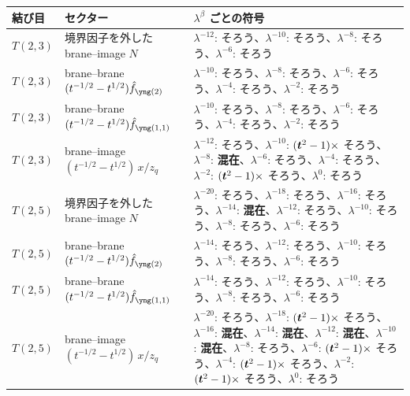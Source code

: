 \begin{center}
\footnotesize
\begin{tabular}{llp{9.2cm}}
\toprule
結び目 & セクター & $\lambda^\beta$ ごとの符号 \\
\midrule
$T(2,3)$ & 境界因子を外した brane--image $N$ & $\lambda^{-12}$: そろう、\allowbreak $\lambda^{-10}$: そろう、\allowbreak $\lambda^{-8}$: そろう、\allowbreak $\lambda^{-6}$: そろう \\
$T(2,3)$ & brane--brane $(t^{-1/2} - t^{1/2})\hat f_{\ytwo}$ & $\lambda^{-10}$: そろう、$\lambda^{-8}$: そろう、$\lambda^{-6}$: そろう、$\lambda^{-4}$: そろう、$\lambda^{-2}$: そろう \\
$T(2,3)$ & brane--brane $(t^{-1/2} - t^{1/2})\hat f_{\yoneone}$ & $\lambda^{-10}$: そろう、$\lambda^{-8}$: そろう、$\lambda^{-6}$: そろう、$\lambda^{-4}$: そろう、$\lambda^{-2}$: そろう \\
$T(2,3)$ & brane--image $(t^{-1/2} - t^{1/2})\,x/z_q$ & $\lambda^{-12}$: そろう、$\lambda^{-10}$: $(\bm{t}^2 - 1)\times$ そろう、$\lambda^{-8}$: \textbf{混在}、$\lambda^{-6}$: そろう、$\lambda^{-4}$: そろう、$\lambda^{-2}$: $(\bm{t}^2 - 1)\times$ そろう、$\lambda^{0}$: そろう \\
$T(2,5)$ & 境界因子を外した brane--image $N$ & $\lambda^{-20}$: そろう、\allowbreak $\lambda^{-18}$: そろう、\allowbreak $\lambda^{-16}$: そろう、\allowbreak $\lambda^{-14}$: \textbf{混在}、\allowbreak $\lambda^{-12}$: そろう、\allowbreak $\lambda^{-10}$: そろう、\allowbreak $\lambda^{-8}$: そろう、\allowbreak $\lambda^{-6}$: そろう \\
$T(2,5)$ & brane--brane $(t^{-1/2} - t^{1/2})\hat f_{\ytwo}$ & $\lambda^{-14}$: そろう、$\lambda^{-12}$: そろう、$\lambda^{-10}$: そろう、$\lambda^{-8}$: そろう、$\lambda^{-6}$: そろう \\
$T(2,5)$ & brane--brane $(t^{-1/2} - t^{1/2})\hat f_{\yoneone}$ & $\lambda^{-14}$: そろう、$\lambda^{-12}$: そろう、$\lambda^{-10}$: そろう、$\lambda^{-8}$: そろう、$\lambda^{-6}$: そろう \\
$T(2,5)$ & brane--image $(t^{-1/2} - t^{1/2})\,x/z_q$ & $\lambda^{-20}$: そろう、$\lambda^{-18}$: $(\bm{t}^2 - 1)\times$ そろう、$\lambda^{-16}$: \textbf{混在}、$\lambda^{-14}$: \textbf{混在}、$\lambda^{-12}$: \textbf{混在}、$\lambda^{-10}$: \textbf{混在}、$\lambda^{-8}$: そろう、$\lambda^{-6}$: $(\bm{t}^2 - 1)\times$ そろう、$\lambda^{-4}$: $(\bm{t}^2 - 1)\times$ そろう、$\lambda^{-2}$: $(\bm{t}^2 - 1)\times$ そろう、$\lambda^{0}$: そろう \\
\bottomrule
\end{tabular}
\end{center}
